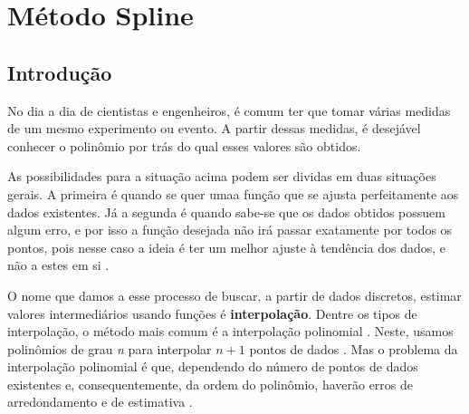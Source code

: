 \chapter[Método Spline]{Método Spline}
\label{cap:metodo}

\section{Introdução}

No dia a dia de cientistas e engenheiros, é comum ter que tomar várias medidas de um mesmo experimento ou evento. A partir dessas medidas, é desejável conhecer o polinômio por trás do qual esses valores são obtidos.

As possibilidades para a situação acima podem ser dividas em duas situações gerais. A primeira é quando se quer umaa função que se ajusta perfeitamente aos dados existentes. Já a segunda é quando sabe-se que os dados obtidos possuem algum erro, e por isso a função desejada não irá passar exatamente por todos os pontos, pois nesse caso a ideia é ter um melhor ajuste à tendência dos dados, e não a estes em si \cite{lindfieldnumerical}.

O nome que damos a esse processo de buscar, a partir de dados discretos, estimar valores intermediários usando funções é \textbf{interpolação}. Dentre os tipos de interpolação, o método mais comum é a interpolação polinomial \cite{chaprametodos}. Neste, usamos polinômios de grau \textit{n} para interpolar $n + 1$ pontos de dados \cite{chaprametodos}. Mas o problema da interpolação polinomial é que, dependendo do número de pontos de dados existentes e, consequentemente, da ordem do polinômio, haverão erros de arredondamento e de estimativa \cite{chaprametodos}.